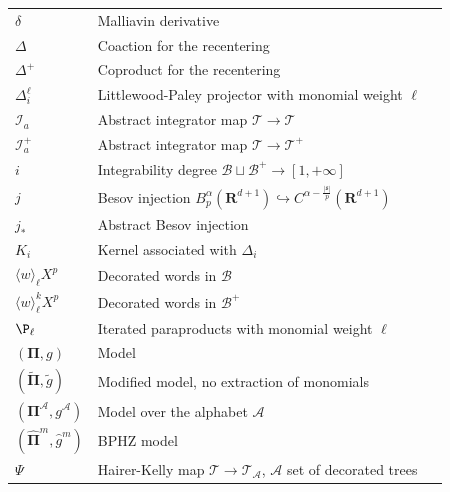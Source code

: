 \documentclass[11pt]{preprint}
\newcommand{\mcB}{\mathcal{B}}
\newcommand{\mcI}{\mathcal{I}}
\def\PPi{\boldsymbol{\Pi}}
\renewcommand{\lg}{\langle}
\newcommand{\rg}{\rangle}
\newcommand{\bfR}{\mathbf{R}}
\begin{document}
\begin{appendix}
\begin{center}
\begin{longtable}{lll}
			\\
			$\delta$ & Malliavin derivative &  \pageref{Malliavin_derivative}
			\\
		$\Delta$	& Coaction for the recentering  & \pageref{eq_sigmabackslashtau}
			\\
				$\Delta^{\!+}$	& Coproduct for the recentering  & \pageref{eq_sigmabackslashtau}
			\\
			$\Delta_i^\ell$  & 	Littlewood-Paley projector with monomial weight $\ell$ & \pageref{eqdef_littlewoodprojectorL} \\ 
			$\mcI_{a}$ & Abstract integrator map $ \mathcal{T} \rightarrow \mathcal{T} $ &
		 \pageref{subsection_DecoratedTrees}
		 \\
	$\mcI_{a}^+$	& Abstract integrator map $ \mathcal{T} \rightarrow \mathcal{T}^+ $ & \pageref{I_+}
			\\
			$i$ & Integrability degree $\mcB\sqcup \mcB^+ \to [1,+\infty]$ & \pageref{integrability}
			\\
		$j$ &  Besov injection $B^{\alpha}_p(\bfR^{d+1}) \hookrightarrow C^{\alpha-\frac{|\mathfrak{s}|}{p}}(\bfR^{d+1})$ & \pageref{Besov_injection}	
		\\
		$ j_*  $ & Abstract Besov injection &   \pageref{inj_ab}
			\\
			 $K_i$ & Kernel associated with $ \Delta_i $ &  \pageref{eqdef_littlewoodprojectorL}
			\\
		  $  \lg w\rg_\ell X^p $	& Decorated words in $ \mcB $  &  \pageref{subsect_theRSIteratedParap}
		  \\
		  $  \lg w\rg_\ell^k X^p $	& Decorated words in $ \mcB^+ $  &  \pageref{subsect_theRSIteratedParap}
			\\
		$	\P_{\ell}$ & Iterated paraproducts with monomial weight $ \ell $ &  \pageref{eqdef_ParapPolWeight2}
		\\
	  $ (\PPi,g)$ & Model & \pageref{model}
	  \\
	  $(\widetilde{ \PPi},\widetilde{g})$ & Modified model, no extraction of monomials  & \pageref{eqdef_pitilde}
	  \\
	  $ (\PPi^\mathcal{A},g^\mathcal{A}) $ & Model over the alphabet $ \mathcal{A} $  &  \pageref{model_words} 
	  \\
	  $(\widehat{\PPi}^m, \widehat{g}^m)$ & BPHZ model & \pageref{BPHZ_model}
	  \\
	 $ \Psi$ & Hairer-Kelly map $ \mathcal{T} \rightarrow \mathcal{T}_{\mathcal{A}} $, $\mathcal{A}$ set of decorated trees  & \pageref{def_Psitau}
	 \\

\end{longtable}
\end{center}
\end{appendix}
\end{document}
